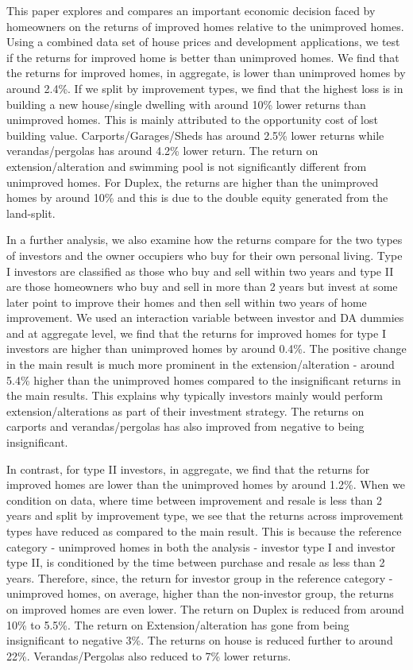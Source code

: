 \documentclass{article}
\begin{document}
This paper explores and compares an important economic decision faced by homeowners on the returns of improved homes relative to the unimproved homes. Using a combined data set of house prices and development applications, we test if the returns for improved home is better than unimproved homes. We find that the returns for improved homes, in aggregate, is lower than unimproved homes by around 2.4\%. If we split by improvement types, we find that the highest loss is in building a new house/single dwelling with around 10\% lower returns than unimproved homes. This is mainly attributed to the opportunity cost of lost building value. Carports/Garages/Sheds has around 2.5\% lower returns while verandas/pergolas has around 4.2\% lower return. The return on extension/alteration and swimming pool is not significantly different from unimproved homes. For Duplex, the returns are higher than the unimproved homes by around 10\% and this is due to the double equity generated from the land-split.

In a further analysis, we also examine how the returns compare for the two types of investors and the owner occupiers who buy for their own personal living. Type I investors are classified as those who buy and sell within two years and type II are those homeowners who buy and sell in more than 2 years but invest at some later point to improve their homes and then sell within two years of home improvement. We used an interaction variable between investor and DA dummies and at aggregate level, we find that the returns for improved homes for type I investors are higher than unimproved homes by around 0.4\%. The positive change in the main result is much more prominent in the extension/alteration - around 5.4\% higher than the unimproved homes compared to the insignificant returns in the main results. This explains why typically investors mainly would perform extension/alterations as part of their investment strategy. The returns on carports and verandas/pergolas has also improved from negative to being insignificant. 

In contrast, for type II investors, in aggregate, we find that the returns for improved homes are lower than the unimproved homes by around 1.2\%. When we condition on data, where time between improvement and resale is less than 2 years and split by improvement type, we see that the returns across improvement types have reduced as compared to the main result. This is because the reference category - unimproved homes in both the analysis - investor type I and investor type II, is conditioned by the time between purchase and resale as less than 2 years. Therefore, since, the return for investor group in the reference category - unimproved homes, on average, higher than the non-investor group, the returns on improved homes are even lower. The return on Duplex is reduced from around 10\% to 5.5\%. The return on Extension/alteration has gone from being insignificant to negative 3\%. The returns on house is reduced further to around 22\%. Verandas/Pergolas also reduced to 7\% lower returns. 
\end{document}
